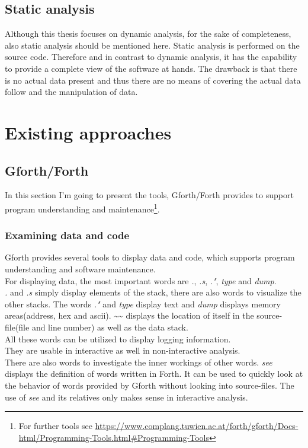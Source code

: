 \subsection{Static analysis}

Although this thesis focuses on dynamic analysis, for the sake of completeness, also static analysis should be mentioned here.
Static analysis is performed on the source code. Therefore and in contrast to dynamic analysis, it has the capability to provide a complete view of the software at hands. The drawback is that there is no actual data present and thus there are no means of covering the actual data follow and the manipulation of data.

\section{Existing approaches}

\subsection{Gforth/Forth}

In this section I'm going to present the tools, Gforth/Forth provides to support program understanding and maintenance\footnote{For further tools see \url{https://www.complang.tuwien.ac.at/forth/gforth/Docs-html/Programming-Tools.html\#Programming-Tools}}.

\subsubsection*{Examining data and code}
Gforth provides several tools to display data and code, which supports program understanding and software maintenance.\\
For displaying data, the most important words are \emph{.}, \emph{.s}, \emph{."}, \emph{type} and \emph{dump}.\\
\emph{.} and \emph{.s} simply display elements of the stack, there are also words to visualize the other stacks.
The words \emph{."} and \emph{type} display text and \emph{dump} displays memory areas(address, hex and ascii).
\textasciitilde\textasciitilde\:  displays the location of itself in the source-file(file and line number) as well as the data stack.\\
All these words can be utilized to display logging information.\\
They are usable in interactive as well in non-interactive analysis.\\
There are also words to investigate the inner workings of other words. 
\emph{see} displays the definition of words written in Forth. It can be used to quickly look at the behavior of words provided by Gforth without looking into source-files. The use of \emph{see} and its relatives only makes sense in interactive analysis.


